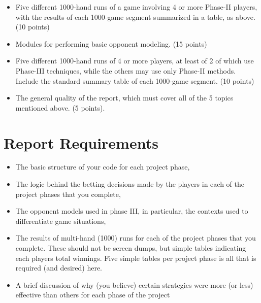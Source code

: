 \documentclass[titlepage]{article}
\begin{document}
\begin{itemize}
\begin{itemize}
\item Five different 1000-hand runs of a game involving 4 or more Phase-II players, with the results of each 1000-game segment summarized in a table, as above. (10 points)

\item Modules for performing basic opponent modeling. (15 points)

\item Five different 1000-hand runs of 4 or more players, at least of 2 of which use Phase-III techniques, while the others may use only Phase-II methods. Include the standard summary table of each 1000-game segment. (10 points)

\item The general quality of the report, which must cover all of the 5 topics mentioned above. (5 points).
\end{itemize}

\section*{Report Requirements}
\begin{itemize}
\item The basic structure of your code for each project phase,

\item The logic behind the betting decisions made by the players in each of the project phases that you complete,

\item The opponent models used in phase III, in particular, the contexts used to differentiate game situations,

\item The results of multi-hand (1000) runs for each of the project phases that you complete. These should not be screen dumps, but simple tables indicating each players total winnings. Five simple tables per project phase is all that is required (and desired) here.

\item A brief discussion of why (you believe) certain strategies were more (or less) effective than others for
each phase of the project
\end{itemize}

\newpage


\end{itemize}
\end{document}
